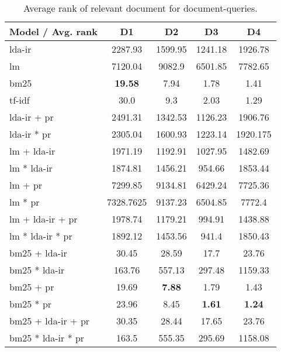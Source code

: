 \begin{table}[h]
	\centering
	\caption{Average rank of relevant document for document-queries.}
	\begin{tabular}{l|c|c|c|c}
		Model / Avg. rank & D1 & D2 & D3 & D4 \\
		\midrule
		\gls{lda}-\gls{ir} & 2287.93 & 1599.95 & 1241.18 & 1926.78 \\
		\gls{lm} & 7120.04 & 9082.9 & 6501.85 & 7782.65 \\
		\gls{bm25} & \textbf{19.58} & 7.94 & 1.78 & 1.41 \\
		\gls{tf-idf} & 30.0 & 9.3 & 2.03 & 1.29 \\
		\gls{lda}-\gls{ir} + \gls{pr} & 2491.31 & 1342.53 & 1126.23 & 1906.76\\
		\gls{lda}-\gls{ir} * \gls{pr} & 2305.04 & 1600.93 & 1223.14 & 1920.175\\
		\gls{lm} + \gls{lda}-\gls{ir} & 1971.19 & 1192.91 & 1027.95 & 1482.69 \\
		\gls{lm} * \gls{lda}-\gls{ir} & 1874.81 & 1456.21 & 954.66 & 1853.44 \\
		\gls{lm} + \gls{pr} & 7299.85 & 9134.81 & 6429.24 & 7725.36 \\
		\gls{lm} * \gls{pr} & 7328.7625 & 9137.23 & 6504.85 & 7772.4\\
		\gls{lm} + \gls{lda}-\gls{ir} + \gls{pr} & 1978.74 & 1179.21 & 994.91 & 1438.88 \\
		\gls{lm} * \gls{lda}-\gls{ir} * \gls{pr} & 1892.12 & 1453.56 & 941.4 & 1850.43 \\
		\gls{bm25} + \gls{lda}-\gls{ir} & 30.45 & 28.59 & 17.7 & 23.76 \\
		\gls{bm25} * \gls{lda}-\gls{ir} & 163.76 & 557.13 & 297.48 & 1159.33 \\
		\gls{bm25} + \gls{pr} & 19.69 & \textbf{7.88} & 1.79 & 1.43\\
		\gls{bm25} * \gls{pr} & 23.96 & 8.45 & \textbf{1.61} & \textbf{1.24}\\
		\gls{bm25} + \gls{lda}-\gls{ir} + \gls{pr} & 30.35 & 28.44 & 17.65 & 23.76\\
		\gls{bm25} * \gls{lda}-\gls{ir} * \gls{pr} & 163.5 & 555.35 & 295.69 & 1158.08\\
	\end{tabular}
	
	\label{tab:hit_results}
\end{table}
